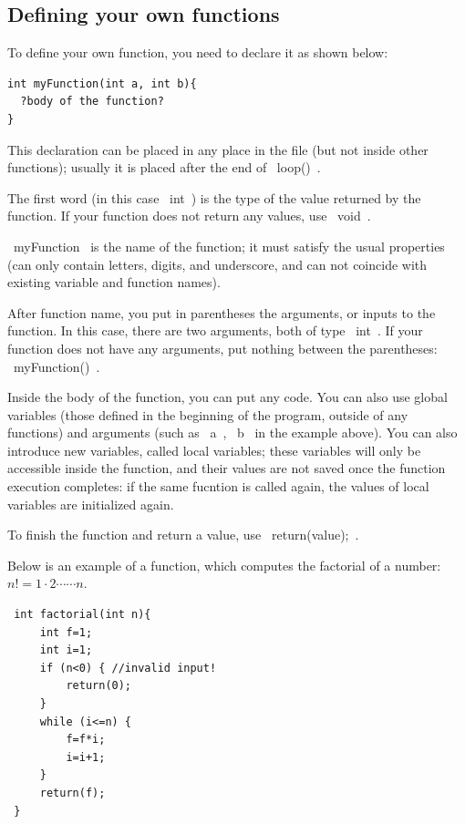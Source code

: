 \documentclass[oneside]{stml-l}
\numberwithin{figure}{chapter}
\begin{document}
\subsection*{Defining your own functions}

To define your own function, you need to declare it as shown below:
\begin{lstlisting}
int myFunction(int a, int b){
  ?body of the function?
}
\end{lstlisting}

This declaration can be placed in any place in the file (but not 
inside other functions); usually it is placed after the end of ~loop()~. 

The first word (in this case ~int~) is the type of the value returned by the 
function. If your function does not return any values, use ~void~. 

~myFunction~ is the name of the function; it must satisfy the usual properties 
(can only contain letters, digits, and underscore, and can not coincide with existing 
variable and function names).

After function name, you put in parentheses the arguments, or inputs to the 
function. In this case, there are two arguments, both of type ~int~. If your 
function does not have any arguments, put nothing between the parentheses: 
~myFunction()~. 

Inside the body of the function, you can put any code. You can also use global 
variables (those defined in the beginning of the program, outside of any 
functions) and arguments (such as ~a~, ~b~ in the example above). You can 
also introduce new variables, called local variables; these variables will only be 
accessible inside the function, and their values are not saved once the function 
execution completes: if the same fucntion is called again, the values of local 
variables are initialized again. 

To finish the function and return a value, use ~return(value);~. 

Below is an example of a function, which computes the factorial of a number: 
$n!=1\cdot 2\cdots \cdots n$.
 \begin{lstlisting}
 int factorial(int n){
     int f=1;
     int i=1;
     if (n<0) { //invalid input!
         return(0);
     }
     while (i<=n) {
         f=f*i;
         i=i+1;
     }
     return(f);
 }
 \end{lstlisting}
\end{document}
